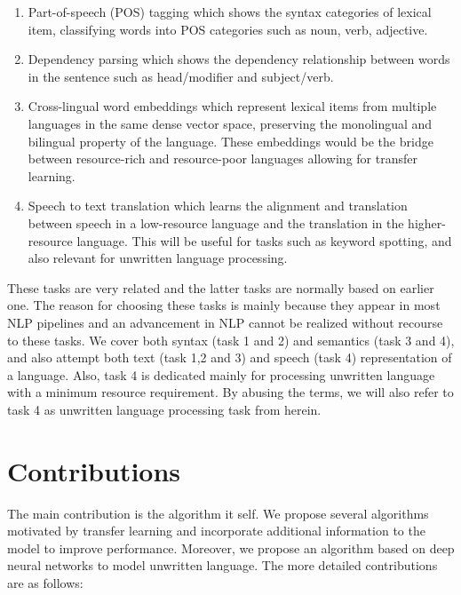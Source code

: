 \documentclass[12pt,twoside,final,hidelinks]{ltthesis}
\theoremstyle{definition}
\begin{document}
\begin{enumerate}
\item Part-of-speech (POS) tagging which shows the syntax categories of lexical item, classifying words into POS categories such as noun, verb, adjective.
\item Dependency parsing which shows the dependency relationship between words in the sentence such as head/modifier and subject/verb. 
\item Cross-lingual word embeddings which represent lexical items from multiple languages in the same dense vector space, preserving the monolingual and bilingual property of the language. These embeddings would be the bridge between resource-rich and resource-poor languages allowing for transfer learning. 
\item Speech to text translation which learns the alignment and translation between speech in a low-resource language and the translation in the higher-resource language. This will be useful for tasks such as keyword spotting, and also relevant for unwritten language processing.  

\end{enumerate}

These tasks are very related and the latter tasks are normally based on earlier one. 
The reason for choosing these tasks is mainly because they appear in most NLP pipelines and an advancement in NLP cannot be realized without recourse to these tasks. We cover both syntax (task 1 and 2) and semantics (task 3 and 4), and also attempt both text (task 1,2 and 3) and speech (task 4) representation of a language. Also, task 4 is dedicated mainly for processing unwritten language with a minimum resource requirement. By abusing the terms, we will also refer to task 4 as unwritten language processing task from herein. 

\section{Contributions}
The main contribution is the algorithm it self. We propose several algorithms motivated by transfer learning and incorporate additional information to the model to improve performance. Moreover, we propose an algorithm based on deep neural networks to model unwritten language. The more detailed contributions are as follows:
\end{document}
